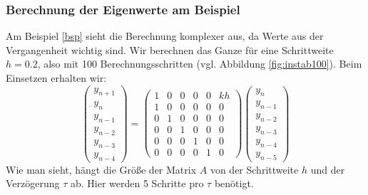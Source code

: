 \subsubsection{Berechnung der Eigenwerte am Beispiel}
Am Beispiel \eqref{bsp} sieht die Berechnung komplexer aus, da Werte aus der Vergangenheit wichtig sind.
Wir berechnen das Ganze für eine Schrittweite $h=0.2$, also mit 100 Berechnungsschritten (vgl. Abbildung \ref{fig:instab100}).
Beim Einsetzen erhalten wir: 
\begin{equation}
	\left( \begin{array}{c}y_{n+1} \\ y_n \\ y_{n-1} \\ y_{n-2} \\ y_{n-3} \\ y_{n-4}\end{array} \right) =
	\begin{pmatrix} 
	1 & 0 & 0 & 0 & 0 & kh \\
	1 & 0 & 0 & 0 & 0 & 0 \\
	0 & 1 & 0 & 0 & 0 & 0 \\
	0 & 0 & 1 & 0 & 0 & 0 \\
	0 & 0 & 0 & 1 & 0 & 0 \\
	0 & 0 & 0 & 0 & 1 & 0
	\end{pmatrix}
	\left( \begin{array}{c}y_{n} \\ y_{n-1} \\ y_{n-2} \\ y_{n-3} \\ y_{n-4} \\y_{n-5} \end{array} \right)
\end{equation}
Wie man sieht, hängt die Größe der Matrix $A$ von der Schrittweite $h$ und der Verzögerung $\tau$ ab.
Hier werden 5 Schritte pro $\tau$ benötigt.
 
